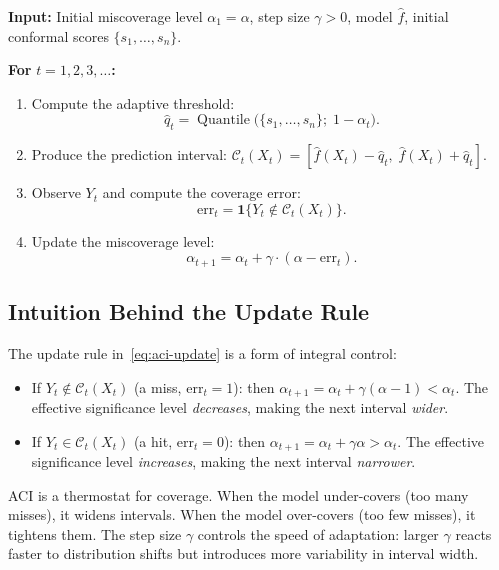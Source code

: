 \documentclass[11pt, a4paper]{article}
\theoremstyle{definition}
\theoremstyle{plain}
\theoremstyle{remark}
\newcommand{\ind}{\boldsymbol{1}}
\newcommand{\Ccal}{\mathcal{C}}
\DeclareMathOperator{\Quantile}{Quantile}
\begin{document}
\begin{algorithmbox}[title={Algorithm 4: Adaptive Conformal Inference (ACI)}]
\label{alg:aci}
\textbf{Input:} Initial miscoverage level $\alpha_1 = \alpha$, step size $\gamma > 0$,
model $\hat{f}$, initial conformal scores $\{s_1, \ldots, s_n\}$.

\textbf{For} $t = 1, 2, 3, \ldots$\textbf{:}
\begin{enumerate}
    \item Compute the adaptive threshold:
    \[
        \hat{q}_t = \Quantile\!\bigl(\{s_1, \ldots, s_n\};\; 1 - \alpha_t\bigr).
    \]
    \item Produce the prediction interval:
    $\Ccal_t(X_t) = [\hat{f}(X_t) - \hat{q}_t,\; \hat{f}(X_t) + \hat{q}_t]$.
    \item Observe $Y_t$ and compute the coverage error:
    \[
        \mathrm{err}_t = \ind\{Y_t \notin \Ccal_t(X_t)\}.
    \]
    \item Update the miscoverage level:
    \begin{equation}\label{eq:aci-update}
        \alpha_{t+1} = \alpha_t + \gamma \cdot (\alpha - \mathrm{err}_t).
    \end{equation}
\end{enumerate}
\end{algorithmbox}

\subsection{Intuition Behind the Update Rule}

The update rule in~\eqref{eq:aci-update} is a form of integral control:

\begin{itemize}
    \item If $Y_t \notin \Ccal_t(X_t)$ (a miss, $\mathrm{err}_t = 1$):
          then $\alpha_{t+1} = \alpha_t + \gamma(\alpha - 1) < \alpha_t$.
          The effective significance level \emph{decreases}, making the next
          interval \emph{wider}.
    \item If $Y_t \in \Ccal_t(X_t)$ (a hit, $\mathrm{err}_t = 0$):
          then $\alpha_{t+1} = \alpha_t + \gamma \alpha > \alpha_t$.
          The effective significance level \emph{increases}, making the next
          interval \emph{narrower}.
\end{itemize}

\begin{keyidea}
ACI is a thermostat for coverage.
When the model under-covers (too many misses), it widens intervals.
When the model over-covers (too few misses), it tightens them.
The step size $\gamma$ controls the speed of adaptation: larger $\gamma$ reacts
faster to distribution shifts but introduces more variability in interval width.
\end{keyidea}
\end{document}
